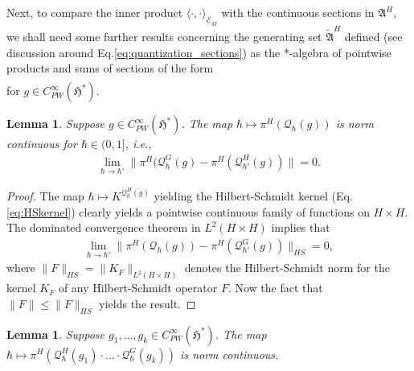 \documentclass[sn-mathphys,Numbered]{sn-jnl}
\newtheorem{lemma}[theorem]{Lemma}%
\providecommand{\norm}[1]{\lVert#1\rVert}
\providecommand{\inner}[2]{\langle#1,#2\rangle}
\begin{document}
\noindent Next, to compare the inner product $\inner{\cdot }{\cdot}_{\underline{\mathcal{E}}_M}$ with the continuous sections in $\mathfrak{A}^H$, we shall need some further results concerning the generating set $\tilde{\mathfrak{A}}^H$ defined (see discussion around Eq.\eqref{eq:quantization_sections}) as the *-algebra of pointwise products and sums of sections of the form
\begin{align}
    [\hbar\mapsto \mathcal{Q}_\hbar^H(g)]
\end{align}
for $g\in C^\infty_{PW}(\mathfrak{H}^*)$.\bigskip

\begin{lemma}
    Suppose $g\in C^\infty_{PW}(\mathfrak{H}^*)$.  The map $\hbar\mapsto \pi^H(\mathcal{Q}_\hbar(g))$ is norm continuous for $\hbar\in (0,1]$, i.e.,
    \begin{align}
        \lim_{\hbar\to\hbar'}\norm{\pi^H(\mathcal{Q}_\hbar^G(g)-\pi^H(\mathcal{Q}_{\hbar'}^H(g))} = 0.
    \end{align}
\end{lemma}

\begin{proof}
    The map $\hbar\mapsto K^{\mathcal{Q}_\hbar^H(g)}$ yielding the Hilbert-Schmidt kernel (Eq.\eqref{eq:HSkernel}) clearly yields a pointwise continuous family of functions on $H\times H$.  The dominated convergence theorem in $L^2(H\times H)$ implies that
    \begin{align}
        \lim_{\hbar\to\hbar'}\norm{\pi^H(\mathcal{Q}_\hbar(g)) - \pi^H(\mathcal{Q}_{\hbar'}^G(g))}_{HS} = 0,
    \end{align}
    where $\norm{F}_{HS} = \norm{K_F}_{L^2(H\times H)}$ denotes the Hilbert-Schmidt norm for the kernel $K_F$ of any Hilbert-Schmidt operator $F$.  Now the fact that $\norm{F}\leq \norm{F}_{HS}$ yields the result.
\end{proof}

\begin{lemma}
\label{lemma:continuity_generating_sections}
    Suppose $g_1,...,g_k\in C^\infty_{PW}(\mathfrak{H}^*)$.  The map $\hbar\mapsto \pi^H(\mathcal{Q}_\hbar^H(g_1)\cdot...\cdot \mathcal{Q}_\hbar^G(g_k))$ is norm continuous.
\end{lemma}
\end{document}
